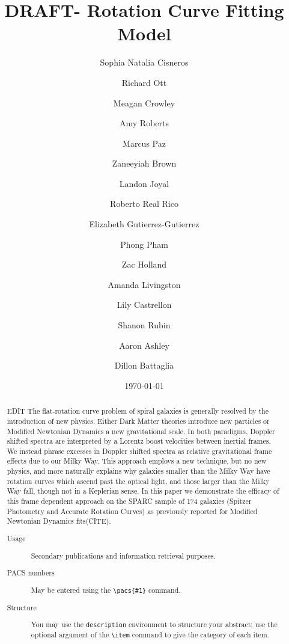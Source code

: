 \documentclass[reprint,%
 amsmath,amssymb,
 aps,
]{revtex4-1}
\begin{document}

\title{DRAFT- Rotation Curve Fitting Model }%


 

\author{Sophia Natalia Cisneros}
  \author{Richard Ott}%
 \author{ Meagan Crowley}
\email{ }
%
 \author{ Amy Roberts}
\email{ }
%
\author{Marcus Paz}
\author{Zaneeyiah Brown}
\author{Landon Joyal}
\author{Roberto Real Rico}
\author{Elizabeth Gutierrez-Gutierrez}
\author{ Phong Pham}
\author{Zac Holland}
\author{Amanda Livingston}
\author{Lily Castrellon}
\author{Shanon Rubin}
\author{Aaron Ashley}
\author{Dillon Battaglia}
%

%
% 

 
\date{\today}%
\begin{abstract}
{\color{teal}  EDIT }
The flat-rotation curve problem of spiral galaxies is generally resolved by the introduction of new physics. Either
 Dark Matter theories introduce new particles or Modified Newtonian Dynamics a new gravitational scale. In both paradigms,     Doppler shifted spectra     are interpreted by a Lorentz boost   velocities between inertial frames. 
 We   instead phrase  excesses in Doppler shifted   spectra  as relative gravitational frame effects due to our Milky Way. 
     This   approach  employs  a new technique, but no new physics, and more naturally explains why galaxies smaller than the Milky Way have rotation curves which ascend past the optical light, and those larger than the Milky Way fall, though not in a Keplerian sense.  
 In this paper we demonstrate the efficacy of  this    frame dependent approach  on  the SPARC sample of 174 galaxies (Spitzer  Photometry and Accurate Rotation Curves) as  previously reported for Modified Newtonian Dynamics  fits(CITE).  

\begin{description}
\item[Usage]
Secondary publications and information retrieval purposes.
\item[PACS numbers]
May be entered using the \verb+\pacs{#1}+ command.
\item[Structure]
You may use the \texttt{description} environment to structure your abstract;
use the optional argument of the \verb+\item+ command to give the category of each item. 
\end{description}
\end{abstract}
\end{document}
